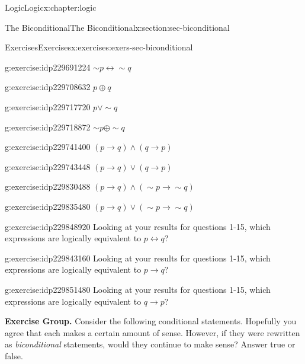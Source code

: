 \documentclass[twoside,10pt,]{book}
\numberwithin{equation}{section}
\newcommand{\conditional}{{p {\rightarrow} q}}
\newcommand{\inverse}{{\sim\!{p}{} {\rightarrow} \sim\!{q}{}}}
\newcommand{\converse}{{q {\rightarrow} p}}
\newcommand{\biconditional}{{p {\leftrightarrow}{} q}}
\begin{document}
\begin{chapterptx}{Logic}{}{Logic}{}{}{x:chapter:logic}
\begin{sectionptx}{The Biconditional}{}{The Biconditional}{}{}{x:section:sec-biconditional}
\begin{exercises-subsection}{Exercises}{}{Exercises}{}{}{x:exercises:exers-sec-biconditional}
\begin{exercisegroup}
\begin{divisionexerciseeg}{8}{}{}{g:exercise:idp229691224}
\(\sim\!{p}{\leftrightarrow}\sim\!{q} \)\end{divisionexerciseeg}%
\begin{divisionexerciseeg}{9}{}{}{g:exercise:idp229708632}%
\(p{\oplus} q \)\end{divisionexerciseeg}%
\begin{divisionexerciseeg}{10}{}{}{g:exercise:idp229717720}%
\(p{\vee}\sim\!{q} \)\end{divisionexerciseeg}%
\begin{divisionexerciseeg}{11}{}{}{g:exercise:idp229718872}%
\(\sim\!{p}{\oplus}\sim\!{q} \)\end{divisionexerciseeg}%
\begin{divisionexerciseeg}{12}{}{}{g:exercise:idp229741400}%
\((\conditional){\wedge}(\converse) \)\end{divisionexerciseeg}%
\begin{divisionexerciseeg}{13}{}{}{g:exercise:idp229743448}%
\((\conditional){\vee}(\converse) \)\end{divisionexerciseeg}%
\begin{divisionexerciseeg}{14}{}{}{g:exercise:idp229830488}%
\((\conditional){\wedge}(\inverse) \)\end{divisionexerciseeg}%
\begin{divisionexerciseeg}{15}{}{}{g:exercise:idp229835480}%
\((\conditional){\vee}(\inverse) \)\end{divisionexerciseeg}%
\end{exercisegroup}
\par\medskip\noindent
\begin{divisionexercise}{16}{}{}{g:exercise:idp229848920}%
Looking at your results for questions 1-15, which expressions are logically equivalent to \(\biconditional\)?\end{divisionexercise}%
\begin{divisionexercise}{17}{}{}{g:exercise:idp229843160}%
Looking at your results for questions 1-15, which expressions are logically equivalent to \(\conditional\)?\end{divisionexercise}%
\begin{divisionexercise}{18}{}{}{g:exercise:idp229851480}%
Looking at your results for questions 1-15, which expressions are logically equivalent to \(\converse\)?\end{divisionexercise}%
\par\medskip\noindent%
\textbf{Exercise Group.}\space\space%
Consider the following conditional statements.  Hopefully you agree that each makes a certain amount of sense.  However, if they were rewritten as \emph{biconditional} statements, would they continue to make sense?  Answer true or false.\begin{exercisegroup}

\end{exercisegroup}
\end{exercises-subsection}
\end{sectionptx}
\end{chapterptx}
\end{document}

